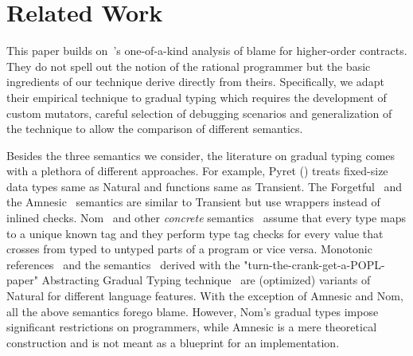 \section{Related Work}

This paper builds on~\citet{lksfd-popl-2020}'s one-of-a-kind analysis of
blame for higher-order contracts. They do not spell out the notion of the
rational programmer but the basic ingredients of our technique derive
directly from theirs. Specifically, we adapt their empirical technique
to gradual typing which requires the development of custom mutators,
careful selection of debugging scenarios and generalization of the
technique to allow the comparison of different semantics. 

Besides the three semantics we consider, the literature on gradual typing
comes with a plethora of different approaches. For example, Pyret
() treats fixed-size data types same as Natural
and functions same as Transient. The Forgetful~\cite{cl-icfp-2017} and
the Amnesic~\cite{gfd-oopsla-2019} semantics are similar  to Transient but
use wrappers instead of inlined checks.  Nom~\cite{mt-oopsla-2017} and
other \emph{concrete\/} semantics~\cite{wnlov-popl-2010, rsfbv-popl-2015,
rzv-ecoop-2015, rat-oopsla-2017} assume that every type maps to a unique
known tag and they perform type tag checks  for every value that crosses
from typed to untyped parts of a program or vice versa.  Monotonic
references~\cite{svctg-esop-2015} and the semantics~\cite{tlt-popl-2019,
etg-icfp-19, tt-scp-20, tgt-popl-18, tt-sas-17} derived with the
"turn-the-crank-get-a-POPL-paper" Abstracting Gradual Typing
technique~\cite{gct-popl-2016} are (optimized) variants of Natural for
different language features.  With the exception of Amnesic and Nom, all
the above semantics forego blame. However,  Nom's gradual types impose
significant restrictions on programmers, while Amnesic is a mere
theoretical construction and is not meant as a blueprint for an
implementation. 
 
